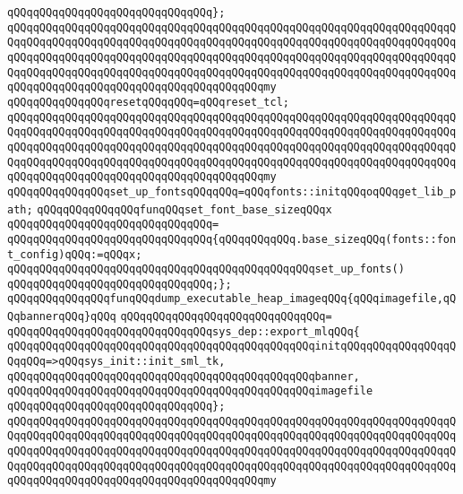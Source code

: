 \verb|qQQqqQQqqQQqqQQqqQQqqQQqqQQqqQQq};|\newline
\verb|qQQqqQQqqQQqqQQqqQQqqQQqqQQqqQQqqQQqqQQqqQQqqQQqqQQqqQQqqQQqqQQqqQQqqQQqqQQqqQQqqQQqqQQqqQQqqQQqqQQqqQQqqQQqqQQqqQQqqQQqqQQqqQQqqQQqqQQqqQQqqQQqqQQqqQQqqQQqqQQqqQQqqQQqqQQqqQQqqQQqqQQqqQQqqQQqqQQqqQQqqQQqqQQqqQQqqQQqqQQqqQQqqQQqqQQqqQQqqQQqqQQqqQQqqQQqqQQqqQQqqQQqqQQqqQQqqQQqqQQqqQQqqQQqqQQqqQQqqQQqqQQqqQQqqQQqqQQqqQQqmy|\newline
\verb|qQQqqQQqqQQqqQQqresetqQQqqQQq=qQQqreset_tcl;|\newline
\verb|qQQqqQQqqQQqqQQqqQQqqQQqqQQqqQQqqQQqqQQqqQQqqQQqqQQqqQQqqQQqqQQqqQQqqQQqqQQqqQQqqQQqqQQqqQQqqQQqqQQqqQQqqQQqqQQqqQQqqQQqqQQqqQQqqQQqqQQqqQQqqQQqqQQqqQQqqQQqqQQqqQQqqQQqqQQqqQQqqQQqqQQqqQQqqQQqqQQqqQQqqQQqqQQqqQQqqQQqqQQqqQQqqQQqqQQqqQQqqQQqqQQqqQQqqQQqqQQqqQQqqQQqqQQqqQQqqQQqqQQqqQQqqQQqqQQqqQQqqQQqqQQqqQQqqQQqqQQqqQQqmy|\newline
\verb|qQQqqQQqqQQqqQQqset_up_fontsqQQqqQQq=qQQqfonts::initqQQqoqQQqget_lib_path;|\newline
\newline
\verb|qQQqqQQqqQQqqQQqfunqQQqset_font_base_sizeqQQqx|\newline
\verb|qQQqqQQqqQQqqQQqqQQqqQQqqQQqqQQq=|\newline
\verb|qQQqqQQqqQQqqQQqqQQqqQQqqQQqqQQq{qQQqqQQqqQQq.base_sizeqQQq(fonts::font_config)qQQq:=qQQqx;|\newline
\verb|qQQqqQQqqQQqqQQqqQQqqQQqqQQqqQQqqQQqqQQqqQQqqQQqset_up_fonts()|\newline
\verb|qQQqqQQqqQQqqQQqqQQqqQQqqQQqqQQq;};|\newline
\newline
\verb|qQQqqQQqqQQqqQQqfunqQQqdump_executable_heap_imageqQQq{qQQqimagefile,qQQqbannerqQQq}qQQq|\newline
\verb|qQQqqQQqqQQqqQQqqQQqqQQqqQQqqQQq=|\newline
\verb|qQQqqQQqqQQqqQQqqQQqqQQqqQQqqQQqsys_dep::export_mlqQQq{|\newline
\verb|qQQqqQQqqQQqqQQqqQQqqQQqqQQqqQQqqQQqqQQqqQQqqQQqinitqQQqqQQqqQQqqQQqqQQqqQQq=>qQQqsys_init::init_sml_tk,|\newline
\verb|qQQqqQQqqQQqqQQqqQQqqQQqqQQqqQQqqQQqqQQqqQQqqQQqbanner,|\newline
\verb|qQQqqQQqqQQqqQQqqQQqqQQqqQQqqQQqqQQqqQQqqQQqqQQqimagefile|\newline
\verb|qQQqqQQqqQQqqQQqqQQqqQQqqQQqqQQq};|\newline
\verb|qQQqqQQqqQQqqQQqqQQqqQQqqQQqqQQqqQQqqQQqqQQqqQQqqQQqqQQqqQQqqQQqqQQqqQQqqQQqqQQqqQQqqQQqqQQqqQQqqQQqqQQqqQQqqQQqqQQqqQQqqQQqqQQqqQQqqQQqqQQqqQQqqQQqqQQqqQQqqQQqqQQqqQQqqQQqqQQqqQQqqQQqqQQqqQQqqQQqqQQqqQQqqQQqqQQqqQQqqQQqqQQqqQQqqQQqqQQqqQQqqQQqqQQqqQQqqQQqqQQqqQQqqQQqqQQqqQQqqQQqqQQqqQQqqQQqqQQqqQQqqQQqqQQqqQQqqQQqqQQqmy|\newline
